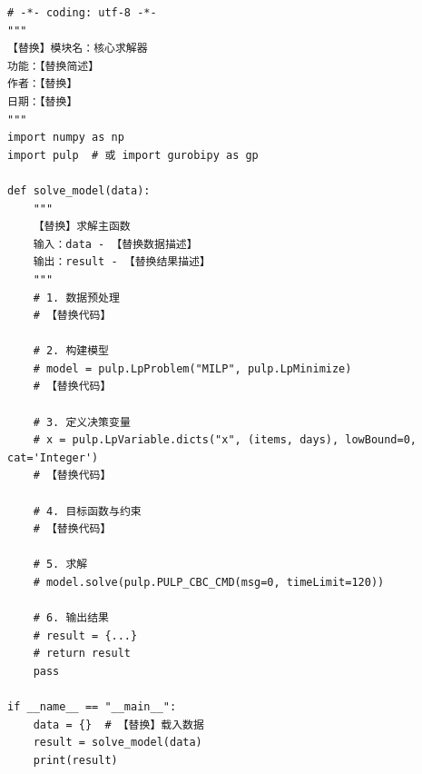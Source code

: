 \documentclass[12pt,a4paper,fontset=fandol]{ctexart}
\begin{document}
\begin{lstlisting}[caption={【替换】核心求解程序代码}, label={code:solver}]
# -*- coding: utf-8 -*-
"""
【替换】模块名：核心求解器
功能：【替换简述】
作者：【替换】
日期：【替换】
"""
import numpy as np
import pulp  # 或 import gurobipy as gp

def solve_model(data):
    """
    【替换】求解主函数
    输入：data - 【替换数据描述】
    输出：result - 【替换结果描述】
    """
    # 1. 数据预处理
    # 【替换代码】

    # 2. 构建模型
    # model = pulp.LpProblem("MILP", pulp.LpMinimize)
    # 【替换代码】

    # 3. 定义决策变量
    # x = pulp.LpVariable.dicts("x", (items, days), lowBound=0, cat='Integer')
    # 【替换代码】

    # 4. 目标函数与约束
    # 【替换代码】

    # 5. 求解
    # model.solve(pulp.PULP_CBC_CMD(msg=0, timeLimit=120))

    # 6. 输出结果
    # result = {...}
    # return result
    pass

if __name__ == "__main__":
    data = {}  # 【替换】载入数据
    result = solve_model(data)
    print(result)
\end{lstlisting}
\end{document}
